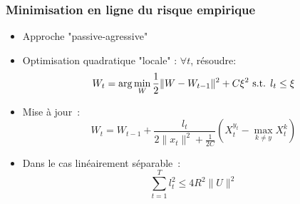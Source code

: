 \documentclass{beamer}
\begin{document}
\begin{frame}\frametitle{Minimisation en ligne du risque empirique}
	\begin{itemize}
		\item Approche "passive-agressive" \cite{crammer2006online}
		\item Optimisation quadratique "locale" : $\forall t$, résoudre: 
		$$W_{t} = \arg \min_W \frac{1}{2} \| W - W_{t-1}\|^2 + C \xi^2 \hbox{ s.t. } l_t \leq \xi$$
		\item Mise à jour~:
		$$W_{t} =  W_{t-1} + \frac{l_t}{2\|x_t\|^2 + \frac{1}{2C}}  (X_t^{y_t} - \max_{k \neq y} X_t^k)$$
		\item Dans le cas linéairement séparable~:
		$$\sum_{t=1}^{T} l_t^2 \leqslant 4 R^2 \parallel{U}\parallel^2$$
	\end{itemize}
\end{frame}
% 
% 
\end{document}
